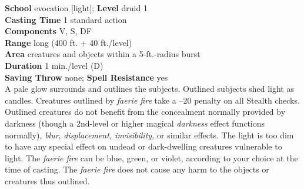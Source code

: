 \textbf{School} evocation [light]; \textbf{Level} druid 1\\
\textbf{Casting Time} 1 standard action\\
\textbf{Components} V, S, DF\\
\textbf{Range} long (400 ft. + 40 ft./level)\\
\textbf{Area} creatures and objects within a 5-ft.-radius burst\\
\textbf{Duration} 1 min./level (D)\\
\textbf{Saving Throw} none; \textbf{Spell Resistance} yes\\
A pale glow surrounds and outlines the subjects. Outlined subjects shed light as candles. Creatures outlined by \textit{faerie fire} take a –20 penalty on all Stealth checks. Outlined creatures do not benefit from the concealment normally provided by darkness (though a 2nd-level or higher magical \textit{darkness }effect functions normally), \textit{blur}, \textit{displacement, invisibility,} or similar effects. The light is too dim to have any special effect on undead or dark-dwelling creatures vulnerable to light. The \textit{faerie fire }can be blue, green, or violet, according to your choice at the time of casting. The \textit{faerie fire }does not cause any harm to the objects or creatures thus outlined.\\
